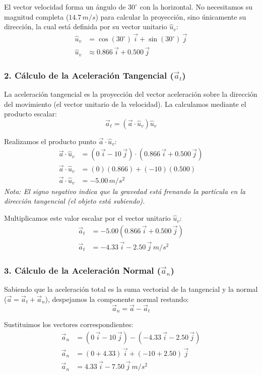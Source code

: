 \documentclass[12pt, a4paper]{article}
\begin{document}
El vector velocidad forma un ángulo de $30^\circ$ con la horizontal. No necesitamos su magnitud completa ($14.7 \, \si{m/s}$) para calcular la proyección, sino únicamente su dirección, la cual está definida por su vector unitario $\hat{u}_v$:
\begin{align*}
    \hat{u}_v &= \cos(30^\circ) \, \vec{i} + \sin(30^\circ) \, \vec{j} \\
    \hat{u}_v &\approx 0.866 \, \vec{i} + 0.500 \, \vec{j}
\end{align*}

\subsubsection*{2. Cálculo de la Aceleración Tangencial ($\vec{a}_t$)}
La aceleración tangencial es la proyección del vector aceleración sobre la dirección del movimiento (el vector unitario de la velocidad). La calculamos mediante el producto escalar:
$$ \vec{a}_t = (\vec{a} \cdot \hat{u}_v) \hat{u}_v $$

Realizamos el producto punto $\vec{a} \cdot \hat{u}_v$:
\begin{align*}
    \vec{a} \cdot \hat{u}_v &= (0 \, \vec{i} - 10 \, \vec{j}) \cdot (0.866 \, \vec{i} + 0.500 \, \vec{j}) \\
    \vec{a} \cdot \hat{u}_v &= (0)(0.866) + (-10)(0.500) \\
    \vec{a} \cdot \hat{u}_v &= -5.00 \, \si{m/s^2}
\end{align*}
\textit{Nota: El signo negativo indica que la gravedad está frenando la partícula en la dirección tangencial (el objeto está subiendo).}

Multiplicamos este valor escalar por el vector unitario $\hat{u}_v$:
\begin{align*}
    \vec{a}_t &= -5.00 (0.866 \, \vec{i} + 0.500 \, \vec{j}) \\
    \vec{a}_t &= -4.33 \, \vec{i} - 2.50 \, \vec{j} \, \si{m/s^2}
\end{align*}

\subsubsection*{3. Cálculo de la Aceleración Normal ($\vec{a}_n$)}
Sabiendo que la aceleración total es la suma vectorial de la tangencial y la normal ($\vec{a} = \vec{a}_t + \vec{a}_n$), despejamos la componente normal restando:
$$ \vec{a}_n = \vec{a} - \vec{a}_t $$

Sustituimos los vectores correspondientes:
\begin{align*}
    \vec{a}_n &= (0 \, \vec{i} - 10 \, \vec{j}) - (-4.33 \, \vec{i} - 2.50 \, \vec{j}) \\
    \vec{a}_n &= (0 + 4.33) \, \vec{i} + (-10 + 2.50) \, \vec{j} \\
    \vec{a}_n &= 4.33 \, \vec{i} - 7.50 \, \vec{j} \, \si{m/s^2}
\end{align*}
\end{document}
